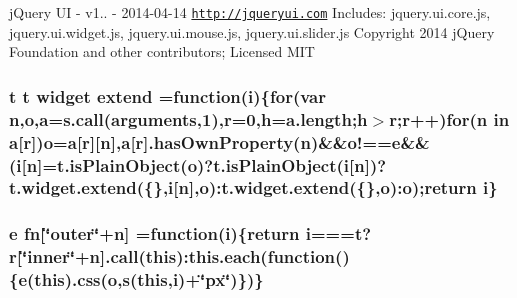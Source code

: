 j\-Query U\-I -\/ v1.. -\/ 2014-\/04-\/14 \href{http://jqueryui.com}{\tt http\-://jqueryui.\-com} Includes\-: jquery.\-ui.\-core.\-js, jquery.\-ui.\-widget.\-js, jquery.\-ui.\-mouse.\-js, jquery.\-ui.\-slider.\-js Copyright 2014 j\-Query Foundation and other contributors; Licensed M\-I\-T \hypertarget{static_2root_2js_2bootstrap_2jquery-ui-1_810_84_8custom_8min_8js_ad56bf8fee2d8093072983fa0dad19143}{
\subsubsection[{extend}]{ {\bf t} {\bf t} {\bf widget} extend =function({\bf i})\{{\bf for}(var {\bf n},{\bf o},{\bf a}={\bf s.\-call}(arguments,1),{\bf r}=0,{\bf h}=a.\-length;{\bf h}$>${\bf r};{\bf r}++){\bf for}({\bf n} in {\bf a}\mbox{[}{\bf r}\mbox{]}){\bf o}={\bf a}\mbox{[}{\bf r}\mbox{]}\mbox{[}{\bf n}\mbox{]},{\bf a}\mbox{[}{\bf r}\mbox{]}.has\-Own\-Property({\bf n})\&\&o!=={\bf e}\&\&({\bf i}\mbox{[}{\bf n}\mbox{]}=t.\-is\-Plain\-Object({\bf o})?t.\-is\-Plain\-Object({\bf i}\mbox{[}{\bf n}\mbox{]})?t.\-widget.\-extend(\{\},{\bf i}\mbox{[}{\bf n}\mbox{]},{\bf o})\-:t.\-widget.\-extend(\{\},{\bf o})\-:{\bf o});return {\bf i}\}}}\label{static_2root_2js_2bootstrap_2jquery-ui-1_810_84_8custom_8min_8js_ad56bf8fee2d8093072983fa0dad19143}
\hypertarget{static_2root_2js_2bootstrap_2jquery-ui-1_810_84_8custom_8min_8js_aabc758060cfaa8c40e1b069c426b2fb9}{
\subsubsection[{fn}]{ {\bf e} fn\mbox{[}\char`\"{}outer\char`\"{}+n\mbox{]} =function({\bf i})\{return {\bf i}==={\bf t}?{\bf r}\mbox{[}\char`\"{}inner\char`\"{}+n\mbox{]}.{\bf call}(this)\-:{\bf this.\-each}(function()\{{\bf e}(this).css({\bf o},{\bf s}(this,{\bf i})+\char`\"{}px\char`\"{})\})\}}}\label{static_2root_2js_2bootstrap_2jquery-ui-1_810_84_8custom_8min_8js_aabc758060cfaa8c40e1b069c426b2fb9}
